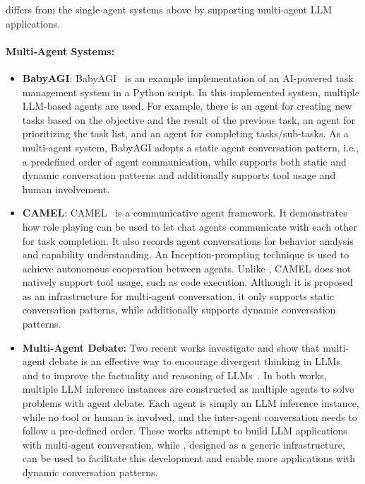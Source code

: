 \libName differs from the single-agent systems above by supporting multi-agent LLM applications.

\paragraph{Multi-Agent Systems:}

\begin{itemize}[leftmargin=*]
    \vspace{-1mm}
    \setlength\itemsep{-0.1em}
    \item \textbf{BabyAGI}: BabyAGI~\cite{babyagi} is an example implementation of an AI-powered task management system in a Python script. In this implemented system, multiple LLM-based agents are used. For example, there is an agent for creating new tasks based on the objective and the result of the previous task, an agent for prioritizing the task list, and an agent for completing tasks/sub-tasks. As a multi-agent system, BabyAGI adopts a static agent conversation pattern, i.e., a predefined order of agent communication, while \libName supports both static and dynamic conversation patterns and additionally supports tool usage and human involvement. 
    \item \textbf{CAMEL}: CAMEL~\cite{li2023camel} is a communicative agent framework. It demonstrates how role playing can be used to let chat agents communicate with each other for task completion. It also records agent conversations for behavior analysis and capability understanding. An Inception-prompting technique is used to achieve autonomous cooperation between agents. Unlike \libName, CAMEL does not natively support tool usage, such as code execution. Although it is proposed as an infrastructure for multi-agent conversation, it only supports static conversation patterns, while \libName additionally supports dynamic conversation patterns.
     
    
    \item \textbf{Multi-Agent Debate:} Two recent works investigate and show that multi-agent debate is an effective way to encourage divergent thinking in LLMs~\cite{liang-arxiv2023} and to improve the factuality and reasoning of LLMs~\cite{du2023improving}. In both works, multiple LLM inference instances are constructed as multiple agents to solve problems with agent debate. 
    Each agent is simply an LLM inference instance, while no tool or human is involved, and the inter-agent conversation needs to follow a pre-defined order.  These works attempt to build LLM applications with multi-agent conversation, while \libName, designed as a generic infrastructure, can be used to facilitate this development and enable more applications with dynamic conversation patterns. 


\end{itemize}
